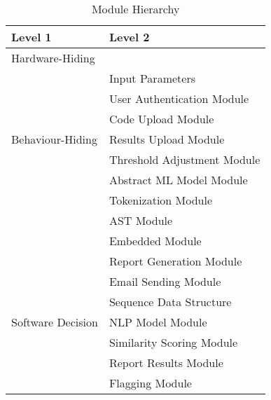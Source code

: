 \documentclass[12pt, titlepage]{article}
\begin{document}
\begin{table}[h!]
\centering
\begin{tabular}{p{} p{}}
\toprule
\textbf{Level 1} & \textbf{Level 2}\\
\midrule

{Hardware-Hiding} & ~ \\
\midrule

\multirow{7}{0.3\textwidth}{Behaviour-Hiding} & Input Parameters\\
& User Authentication Module \\
& Code Upload Module \\
& Results Upload Module \\
& Threshold Adjustment Module \\
& Abstract ML Model Module \\
& Tokenization Module \\
& AST Module \\
& Embedded Module \\
& Report Generation Module \\
& Email Sending Module \\
\midrule

\multirow{3}{0.3\textwidth}{Software Decision} & {Sequence Data Structure}\\
& NLP Model Module \\
& Similarity Scoring Module \\
& Report Results Module \\
& Flagging Module \\
\bottomrule

\end{tabular}
\caption{Module Hierarchy}
\label{TblMH}
\end{table}

\newpage
~\newpage




\end{document}
